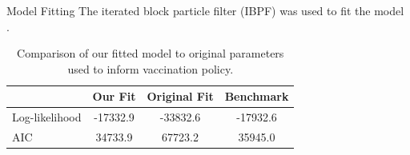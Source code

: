 \documentclass[aspectratio=169]{beamer}\usepackage[]{graphicx}\usepackage[]{xcolor}
\begin{document}

\begin{frame}{Model Fitting}
The iterated block particle filter (IBPF) was used to fit the model \citep{ionides24}.

\begin{table}[ht]
\centering
\begin{tabular}{|l|c|c|c|}
\hline
 & \textbf{Our Fit} & \textbf{Original Fit} & \textbf{Benchmark} \\
\hline
Log-likelihood & \cellcolor{green!20}-17332.9 & \cellcolor{red!20}-33832.6 & -17932.6 \\
\hline
AIC & \cellcolor{green!20}34733.9 & \cellcolor{red!20}67723.2 & 35945.0 \\
\hline
\end{tabular}
\caption{Comparison of our fitted model to original parameters used to inform vaccination policy.}
\label{tab:fit_comparison}
\end{table}

\end{frame}
\end{document}
